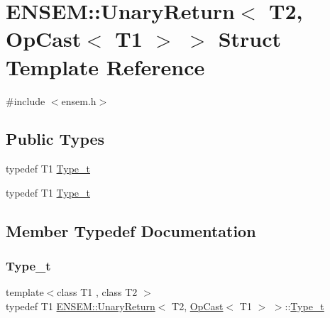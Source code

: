 \hypertarget{structENSEM_1_1UnaryReturn_3_01T2_00_01OpCast_3_01T1_01_4_01_4}{}\section{E\+N\+S\+EM\+:\+:Unary\+Return$<$ T2, Op\+Cast$<$ T1 $>$ $>$ Struct Template Reference}
\label{structENSEM_1_1UnaryReturn_3_01T2_00_01OpCast_3_01T1_01_4_01_4}


{\ttfamily \#include $<$ensem.\+h$>$}

\subsection*{Public Types}
\begin{DoxyCompactItemize}
\item 
typedef T1 \mbox{\hyperlink{structENSEM_1_1UnaryReturn_3_01T2_00_01OpCast_3_01T1_01_4_01_4_a0b016ddfbfa2d0867b9ea61f5768aa06}{Type\+\_\+t}}
\item 
typedef T1 \mbox{\hyperlink{structENSEM_1_1UnaryReturn_3_01T2_00_01OpCast_3_01T1_01_4_01_4_a0b016ddfbfa2d0867b9ea61f5768aa06}{Type\+\_\+t}}
\end{DoxyCompactItemize}


\subsection{Member Typedef Documentation}
\mbox{\label{structENSEM_1_1UnaryReturn_3_01T2_00_01OpCast_3_01T1_01_4_01_4_a0b016ddfbfa2d0867b9ea61f5768aa06}} 
\subsubsection{\texorpdfstring{Type\_t}{Type\_t}\hspace{0.1cm}{\footnotesize\ttfamily [1/2]}}
{\footnotesize\ttfamily template$<$class T1 , class T2 $>$ \\
typedef T1 \mbox{\hyperlink{structENSEM_1_1UnaryReturn}{E\+N\+S\+E\+M\+::\+Unary\+Return}}$<$ T2, \mbox{\hyperlink{structENSEM_1_1OpCast}{Op\+Cast}}$<$ T1 $>$ $>$\+::\mbox{\hyperlink{structENSEM_1_1UnaryReturn_3_01T2_00_01OpCast_3_01T1_01_4_01_4_a0b016ddfbfa2d0867b9ea61f5768aa06}{Type\+\_\+t}}}

